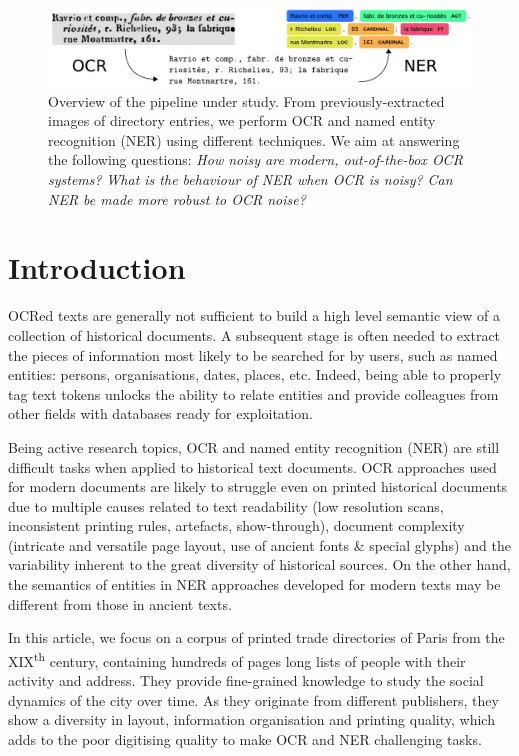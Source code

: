 \begin{figure}[!h]
    \centering
    \includegraphics[width=.9\textwidth]{figs/overview-intro.pdf}
    \caption{%
    Overview of the pipeline under study.
    From previously-extracted images of directory entries, 
    we perform OCR and named entity recognition (NER) using different techniques.
    We aim at answering the following questions:
    \emph{How noisy are modern, out-of-the-box OCR systems?}
    \emph{What is the behaviour of NER when OCR is noisy?}
    \emph{Can NER be made more robust to OCR noise?}
    }
    \label{<label>}
\end{figure}
\clearpage%

\section{Introduction}

OCRed texts are generally not sufficient to build a high level semantic view of a collection of historical documents.
A subsequent stage is often needed to extract the pieces of information most likely to be searched for by users, such as named entities: persons, organisations, dates, places, etc.
Indeed, being able to properly tag text tokens unlocks the ability to relate entities and provide colleagues from other fields with databases ready for exploitation.

Being active research topics, OCR and named entity recognition (NER) are still difficult tasks when applied to historical text documents.
OCR approaches used for modern documents are likely to struggle even on printed historical documents due to multiple causes related to text readability (low resolution scans, inconsistent printing rules, artefacts, show-through), document complexity (intricate and versatile page layout, use of ancient fonts \& special glyphs) and the variability inherent to the great diversity of historical sources.
On the other hand, the semantics of entities in NER approaches developed for modern texts may be different from those in ancient texts.

In this article, we focus on a corpus of printed trade directories of Paris from the XIX\textsuperscript{th} century, containing hundreds of pages long lists of people with their activity and address.
They provide fine-grained knowledge to study the social dynamics of the city over time.
As they originate from different publishers, they show a diversity in layout, information organisation and printing quality, which adds to the poor digitising quality to make OCR and NER challenging tasks.

